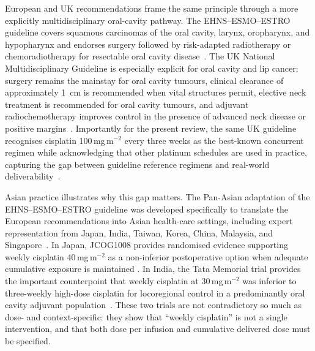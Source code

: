\documentclass[preprint,review,12pt]{elsarticle}
\begin{document}
European and UK recommendations frame the same principle through a more
explicitly multidisciplinary oral-cavity pathway.  The EHNS--ESMO--ESTRO
guideline covers squamous carcinomas of the oral cavity, larynx, oropharynx,
and hypopharynx and endorses surgery followed by risk-adapted radiotherapy
or chemoradiotherapy for resectable oral cavity disease~\cite{Machiels2020}.
The UK National Multidisciplinary Guideline is especially explicit for oral
cavity and lip cancer: surgery remains the mainstay for oral cavity tumours,
clinical clearance of approximately 1~cm is recommended when vital
structures permit, elective neck treatment is recommended for oral cavity
tumours, and adjuvant radiochemotherapy improves control in the presence of
advanced neck disease or positive margins~\cite{Kerawala2016}.  Importantly
for the present review, the same UK guideline recognises cisplatin
100\,mg\,m$^{-2}$ every three weeks as the best-known concurrent regimen
while acknowledging that other platinum schedules are used in practice,
capturing the gap between guideline reference regimens and real-world
deliverability~\cite{Kerawala2016}.

Asian practice illustrates why this gap matters.  The Pan-Asian adaptation
of the EHNS--ESMO--ESTRO guideline was developed specifically to translate
the European recommendations into Asian health-care settings, including
expert representation from Japan, India, Taiwan, Korea, China, Malaysia,
and Singapore~\cite{Keam2021}.  In Japan, JCOG1008 provides randomised
evidence supporting weekly cisplatin 40\,mg\,m$^{-2}$ as a non-inferior
postoperative option when adequate cumulative exposure is maintained
\cite{Kiyota2022}.  In India, the Tata Memorial trial provides the important
counterpoint that weekly cisplatin at 30\,mg\,m$^{-2}$ was inferior to
three-weekly high-dose cisplatin for locoregional control in a predominantly
oral cavity adjuvant population~\cite{Noronha2018}.  These two trials are
not contradictory so much as dose- and context-specific: they show that
``weekly cisplatin'' is not a single intervention, and that both dose per
infusion and cumulative delivered dose must be specified.
\end{document}
